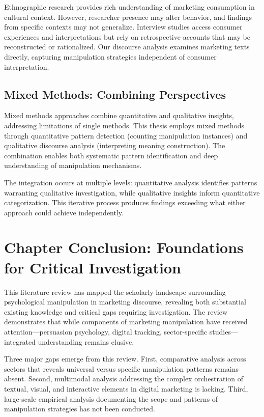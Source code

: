 Ethnographic research provides rich understanding of marketing consumption in cultural context. However, researcher presence may alter behavior, and findings from specific contexts may not generalize. Interview studies access consumer experiences and interpretations but rely on retrospective accounts that may be reconstructed or rationalized. Our discourse analysis examines marketing texts directly, capturing manipulation strategies independent of consumer interpretation.

\subsection{Mixed Methods: Combining Perspectives}

Mixed methods approaches combine quantitative and qualitative insights, addressing limitations of single methods. This thesis employs mixed methods through quantitative pattern detection (counting manipulation instances) and qualitative discourse analysis (interpreting meaning construction). The combination enables both systematic pattern identification and deep understanding of manipulation mechanisms.

The integration occurs at multiple levels: quantitative analysis identifies patterns warranting qualitative investigation, while qualitative insights inform quantitative categorization. This iterative process produces findings exceeding what either approach could achieve independently.

\section{Chapter Conclusion: Foundations for Critical Investigation}
\label{sec:lit_conclusion}

This literature review has mapped the scholarly landscape surrounding psychological manipulation in marketing discourse, revealing both substantial existing knowledge and critical gaps requiring investigation. The review demonstrates that while components of marketing manipulation have received attention—persuasion psychology, digital tracking, sector-specific studies—integrated understanding remains elusive.

Three major gaps emerge from this review. First, comparative analysis across sectors that reveals universal versus specific manipulation patterns remains absent. Second, multimodal analysis addressing the complex orchestration of textual, visual, and interactive elements in digital marketing is lacking. Third, large-scale empirical analysis documenting the scope and patterns of manipulation strategies has not been conducted.

